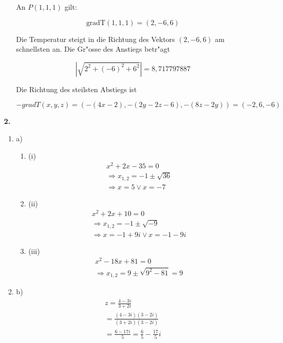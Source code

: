 \documentclass[a4paper,11pt,fleqn]{scrartcl}
\begin{document}
\begin{enumerate}
\begin{enumerate}
            An $P(1,1,1)$ gilt:

            \[\text{gradT}(1,1,1) = (2, -6, 6)\]

            Die Temperatur steigt in die Richtung des Vektors \( (2, -6, 6) \) am schnellsten an.
            Die Gr"osse des Anstiegs betr"agt 

            \[\left|\sqrt{2^2 + (-6)^2 + 6^2}\right| = 8,717797887\]

            Die Richtung des steilsten Abstiegs ist 

            \[-gradT(x,y,z) = (-(4x-2), -(2y-2z-6), -(8z-2y)) = (-2,6,-6)\]

    \end{enumerate}



\item[\textbf{2.}]
\begin{enumerate}
\item a)
	\begin{enumerate}
		\item (i)
		\begin{align*}
			x^2+2x-35=0\\
			\Rightarrow x_{1,2}=-1 \pm \sqrt{36}\\
			\Rightarrow x= 5 \vee x=-7
 		\end{align*}
 		\item (ii)
 		\begin{align*}
 			x^2+2x+10=0\\
 			\Rightarrow x_{1,2}=-1 \pm \sqrt{-9}\\
 			\Rightarrow x= -1 + 9i \vee x=-1-9i
 		\end{align*}
 		\item (iii)
 		\begin{align*}
 			x^2-18x+81=0\\
 			\Rightarrow x_{1,2}=9 \pm \sqrt{9^2 -81} = 9
 		\end{align*}
	\end{enumerate}
	\item b)
	\begin{align*}
		z= \frac{4-3i}{3+2i}\\
		= \frac{(4-3i)(3-2i)}{(3+2i)(3-2i)}\\
		= \frac{6-17i}{5} = \frac{6}{5} - \frac{17}{5}i
	\end{align*}
\end{enumerate}


\end{enumerate}
\end{document}
